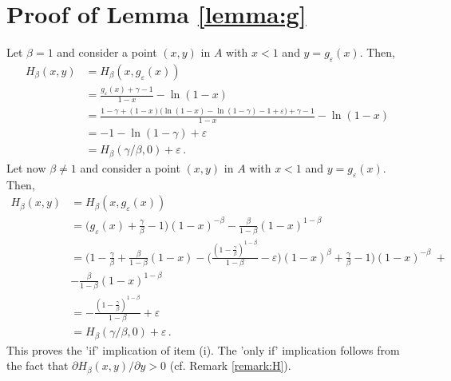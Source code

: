 \documentclass{article}
\begin{document}
  
 

\appendix

\section{Proof of Lemma \ref{lemma:g}}
Let $\beta = 1$ and consider a point $(x,y)$ in $A$ with $x<1$ and $y = g_\varepsilon(x)$. Then,
$$\begin{aligned}
        H_{\beta}(x,y) &= H_{\beta}(x,g_{\varepsilon}(x)) \\[5pt]    
        & = \displaystyle\frac{g_{\varepsilon}(x) + \gamma - 1}{1 - x} - \ln(1 - x)\\
        &= \displaystyle\frac{1 - \gamma + (1 - x)\big(\ln (1-x) - \ln (1-\gamma) -1 + \varepsilon\big) + \gamma - 1}{1 - x} - \ln(1 - x)\\
        &= -1-\ln(1 - \gamma) + \varepsilon \\
        &= H_\beta(\gamma/\beta,0) + \varepsilon\,.
    \end{aligned}$$
Let now $\beta \neq 1$ and consider a point $(x,y)$ in $A$ with $x<1$ and $y = g_\varepsilon(x)$. Then,
    $$\begin{aligned}
        H_{\beta}(x,y) &= H_{\beta}(x,g_{\varepsilon}(x)) \\
        &= \Big(g_{\varepsilon}(x) + \displaystyle\frac{\gamma}{\beta} - 1\Big)(1 - x)^{-\beta} - \frac{\beta}{1 - \beta}(1 - x)^{1 - \beta}\\
        &= \Bigg(1 - \displaystyle\frac{\gamma}{\beta} + \frac{\beta}{1 - \beta}(1 - x) - \bigg(\frac{(1-\frac{\gamma}{\beta})^{1-\beta}}{1-\beta}-\varepsilon\bigg)(1-x)^{\beta}+\frac{\gamma}{\beta}-1\Bigg)(1 - x)^{-\beta} \ + \\
        &-\frac{\beta}{1 - \beta}(1 - x)^{1 - \beta}\\[5pt]
        &= - \displaystyle\frac{(1-\frac{\gamma}{\beta})^{1-\beta}}{1-\beta} + \varepsilon \\[5pt]
        &= H_\beta(\gamma/\beta,0) + \varepsilon\,.
    \end{aligned}$$
This proves the 'if' implication of item (i). The 'only if' implication follows from the fact that $\partial H_\beta(x,y) / \partial y > 0$ (cf. Remark \ref{remark:H}). 
\end{document}

